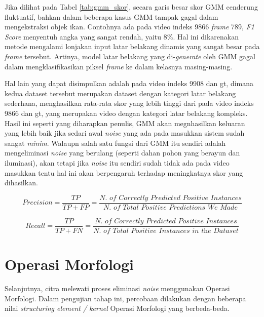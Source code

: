     	Jika dilihat pada Tabel \ref{tab:gmm_skor}, secara garis besar skor GMM cenderung fluktuatif, bahkan dalam beberapa kasus GMM tampak gagal dalam mengekstraksi objek ikan. Contohnya ada pada video indeks 9866 \textit{frame} 789, \textit{F1 Score} menyentuh angka yang sangat rendah, yaitu $8\%$. Hal ini dikarenakan metode mengalami lonjakan input latar belakang dinamis yang sangat besar pada \textit{frame} tersebut. Artinya, model latar belakang yang di-\textit{generate} oleh GMM gagal dalam mengklasifikasikan piksel \textit{frame} ke dalam kelasnya masing-masing.
    	
    	Hal lain yang dapat disimpulkan adalah pada video indeks 9908 dan gt, dimana kedua dataset tersebut merupakan dataset dengan kategori latar belakang sederhana, menghasilkan rata-rata skor yang lebih tinggi dari pada video indeks 9866 dan gt, yang merupakan video dengan kategori latar belakang kompleks. Hasil ini seperti yang diharapkan penulis, GMM akan megnhasilkan keluaran yang lebih baik jika sedari awal \textit{noise} yang ada pada masukkan sistem sudah sangat \textit{minim}. Walaupn salah satu fungsi dari GMM itu sendiri adalah mengeliminasi \textit{noise} yang berulang (seperti dahan pohon yang berayun dan iluminasi), akan tetapi jika \textit{noise} itu sendiri sudah tidak ada pada video masukkan tentu hal ini akan berpengaruh terhadap meningkatnya skor yang dihasilkan.
    	
    	\begin{equation}\label{eq:3.5}
    		Precision = \frac{TP}{TP + FP} = \frac{\textit{N. of Correctly Predicted Positive Instances}}{\textit{N. of Total Positive Predictions We Made}}
    	\end{equation}
    
    	\begin{equation}\label{eq:3.5}
	    	Recall = \frac{TP}{TP + FN} = \frac{\textit{N. of Correctly Predicted Positive Instances}}{\textit{N. of Total Positive Instances in the Dataset}}
    	\end{equation}
    
    \vspace{2cm}
        
	\section{Operasi Morfologi}
		Selanjutnya, citra melewati proses eliminasi \textit{noise} menggunakan Operasi Morfologi. Dalam pengujian tahap ini, percobaan dilakukan dengan beberapa nilai \textit{structuring element / kernel} Operasi Morfologi yang berbeda-beda.
  
